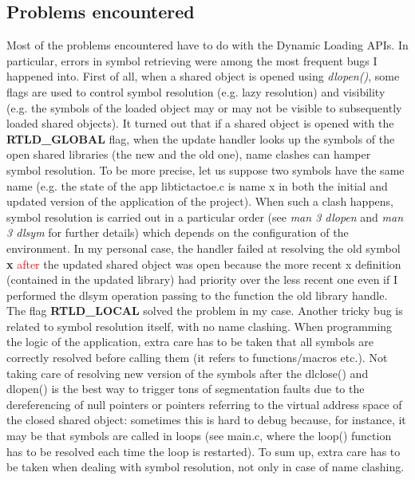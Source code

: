 \documentclass[10pt,a4]{article}
\begin{document}
\subsection{Problems encountered}
Most of the problems encountered have to do with the Dynamic Loading APIs. In particular, errors in symbol retrieving were among the most frequent bugs I happened into. 
\newline
First of all, when a shared object is opened using \textit{dlopen()}, some flags are used to control symbol resolution (e.g. lazy resolution) and visibility (e.g. the symbols of the loaded object may or may not be visible to subsequently loaded shared objects). It turned out that if a shared object is opened with the \textbf{RTLD\_GLOBAL} flag, when the update handler looks up the symbols of the open shared libraries (the new and the old one), name clashes can hamper symbol resolution. To be more precise, let us suppose two symbols have the same name (e.g. the state of the app libtictactoe.c is name x in both the initial and updated version of the application of the project). When such a clash happens, symbol resolution is carried out in a particular order (see \textit{man 3 dlopen} and \textit{man 3 dlsym} for further details) which depends on the configuration of the environment. In my personal case, the handler failed at resolving the old symbol \textbf{x} \textcolor{red}{after} the updated shared object was open because the more recent x definition (contained in the updated library) had priority over the less recent one even if I performed the dlsym operation passing to the function the old library handle. The flag \textbf{RTLD\_LOCAL} solved the problem in my case.\newline
Another tricky bug is related to symbol resolution itself, with no name clashing. When programming the logic of the application, extra care has to be taken that all symbols are correctly resolved before calling them (it refers to functions/macros etc.). Not taking care of resolving new version of the symbols after the dlclose() and dlopen() is the best way to trigger tons of segmentation faults due to the dereferencing of null pointers or pointers referring to the virtual address space of the closed shared object: sometimes this is hard to debug because, for instance, it may be that symbols are called in loops (see main.c, where the loop() function has to be resolved each time the loop is restarted). 
\newline
To sum up, extra care has to be taken when dealing with symbol resolution, not only in case of name clashing. 
\printbibliography
\end{document}
